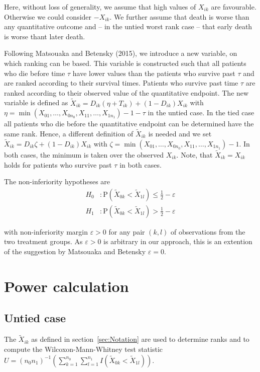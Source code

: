 \documentclass[bimj,fleqn]{w-art}\usepackage[]{graphicx}\usepackage[]{color}
\theoremstyle{plain}
\theoremstyle{definition}
\begin{document}
Here, without loss of generality, we assume that high values of $X_{ik}$ are
favourable. Otherwise we could consider $-X_{ik}$. We further assume that
death is worse than any quantitative outcome and -- in the untied worst rank
case -- that early death is worse thant later death.

Following Matsouaka and Betensky (2015), we introduce a new variable, on which
ranking can be based. This variable is constructed such that all patients who
die before time $\tau$ have lower values than the patients who survive past
$\tau$ and are ranked according to their survival times. Patients who survive
past time $\tau$ are ranked according to their observed value of the quantitative
endpoint. The new variable is defined as
$\widetilde{X}_{ik} = D_{ik}(\eta  + T_{ik}) + (1 - D_{ik})X_{ik}$ with
$\eta = \min(X_{01}, \ldots, X_{0n_0}, X_{11}, \ldots, X_{1n_1}) - 1 - \tau$
in the untied case. In the tied case all patients who die before the quantitative endpoint
can be determined have the same rank. Hence, a different definition of $\widetilde{X}_{ik}$
is needed and we set  $\widetilde{X}_{ik} = D_{ik}\zeta   + (1 - D_{ik})X_{ik}$
with $\zeta = \min(X_{01}, \ldots, X_{0n_0}, X_{11}, \ldots, X_{1n_1}) - 1$.
In both cases, the minimum is taken over the observed $X_{ik}$.
Note, that  $\widetilde{X}_{ik} = {X}_{ik}$ holds for patients who survive past $\tau$ in both cases.

  The non-inferiority hypotheses are
\begin{align*}
  H_0 &:  \text{P}(\widetilde{X}_{0k} < \widetilde{X}_{1l})
          \leq \frac{1}{2} - \varepsilon \\
H_1 &:  \text{P}(\widetilde{X}_{0k} < \widetilde{X}_{1l})
          > \frac{1}{2} - \varepsilon
\end{align*}

with non-inferiority margin $\varepsilon > 0$ for any pair $(k, l)$ of
observations from the two treatment groups. As $\varepsilon > 0 $ is arbitrary
in our approach, this is an extention of the suggestion by Matsouaka and
Betensky $\varepsilon = 0 $.

\section{Power calculation}
\label{sec:Power}
\subsection{Untied case}
\label{sec:PowerUntied}
The $\widetilde{X}_{ik}$ as defined in section~\ref{sec:Notation} are used to
  determine ranks and to compute the Wilcoxon-Mann-Whitney test statistic
  $ U =(n_0 n_1)^{-1}(\sum_{k=1}^{n_0}
    \sum_{l=1}^{n_1}I(\widetilde{X}_{0k} < \widetilde{X}_{1l})) $.
\end{document}
